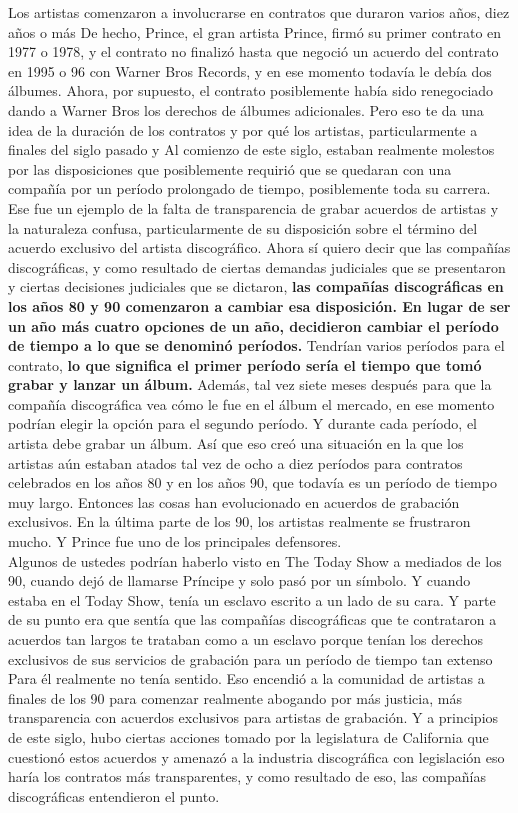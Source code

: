 \documentclass[10pt]{book}
\begin{document}
Los artistas comenzaron a involucrarse en contratos que duraron varios años, diez años o más De hecho, Prince, el gran artista Prince, firmó su primer contrato en 1977 o 1978, y el contrato no finalizó hasta que negoció un acuerdo del contrato en 1995 o 96 con Warner Bros Records, y en ese momento todavía le debía dos álbumes. Ahora, por supuesto, el contrato posiblemente había sido renegociado dando a Warner Bros los derechos de álbumes adicionales. Pero eso te da una idea de la duración de los contratos y por qué los artistas, particularmente a finales del siglo pasado y Al comienzo de este siglo, estaban realmente molestos por las disposiciones que posiblemente requirió que se quedaran con una compañía por un período prolongado de tiempo, posiblemente toda su carrera. Ese fue un ejemplo de la falta de transparencia de grabar acuerdos de artistas y la naturaleza confusa, particularmente de su disposición sobre el término del acuerdo exclusivo del artista discográfico. Ahora sí quiero decir que las compañías discográficas, y como resultado de ciertas demandas judiciales que se presentaron y ciertas decisiones judiciales que se dictaron, \textbf{las compañías discográficas en los años 80 y 90 comenzaron a cambiar esa disposición. En lugar de ser un año más cuatro opciones de un año, decidieron cambiar el período de tiempo a lo que se denominó períodos.} Tendrían varios períodos para el contrato, \textbf{lo que significa el primer período sería el tiempo que tomó grabar y lanzar un álbum.} Además, tal vez siete meses después para que la compañía discográfica vea cómo le fue en el álbum el mercado, en ese momento podrían elegir la opción para el segundo período. Y durante cada período, el artista debe grabar un álbum. Así que eso creó una situación en la que los artistas aún estaban atados tal vez de ocho a diez períodos para contratos celebrados en los años 80 y en los años 90, que todavía es un período de tiempo muy largo. Entonces las cosas han evolucionado en acuerdos de grabación exclusivos. En la última parte de los 90, los artistas realmente se frustraron mucho. Y Prince fue uno de los principales defensores.\\
Algunos de ustedes podrían haberlo visto en The Today Show a mediados de los 90, cuando dejó de llamarse Príncipe y solo pasó por un símbolo. Y cuando estaba en el Today Show, tenía un esclavo escrito a un lado de su cara. Y parte de su punto era que sentía que las compañías discográficas que te contrataron a acuerdos tan largos te trataban como a un esclavo porque tenían los derechos exclusivos de sus servicios de grabación para un período de tiempo tan extenso Para él realmente no tenía sentido. Eso encendió a la comunidad de artistas a finales de los 90 para comenzar realmente abogando por más justicia, más transparencia con acuerdos exclusivos para artistas de grabación. Y a principios de este siglo, hubo ciertas acciones tomado por la legislatura de California que cuestionó estos acuerdos y amenazó a la industria discográfica con legislación eso haría los contratos más transparentes, y como resultado de eso, las compañías discográficas entendieron el punto.\\
\end{document}
